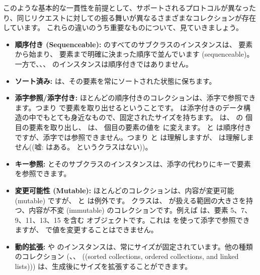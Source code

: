 \documentclass[a4paper,10pt,twoside]{book}
\begin{document}
このような基本的な一貫性を前提として、サポートされるプロトコルが異なったり、同じリクエストに対しての振る舞いが異なるさまざまなコレクションが存在しています。
これらの違いのうち重要なものについて、見ていきましょう。

\begin{itemize}
  \item {\bf 順序付き (Sequenceable):}
   のすべてのサブクラスのインスタンスは、 要素から始まり、 要素まで明確に決まった順序で並んでいます (sequenceable)。
  一方で、\mbox{、}\mbox{、} のインスタンスは順序付きではありません。

  \item {\bf ソート済み:}
   は、その要素を常にソートされた状態に保ちます。

  \item {\bf 添字参照/添字付き:}
        ほとんどの順序付きのコレクションは、添字で参照できます。つまり  で要素を取り出せるということです。
         は添字付きのデータ構造の中でもとても身近なもので、固定されたサイズを持ちます。 は、 の  個目の要素を取り出し、 は、 個目の要素の値を  に変えます。
         と  は順序付きですが、添字では参照できません。つまり  と  は理解しますが、 は理解しません((嘘:  はある。 というクラスはない))。

  \item {\bf キー参照:}
	 とそのサブクラスのインスタンスは、添字の代わりにキーで要素を参照できます。

  \item {\bf 変更可能性 (Mutable):}
        ほとんどのコレクションは、内容が変更可能 (mutable) ですが、 と  は例外です。
         クラスは、 が扱える範囲の大きさを持つ、内容が不変 (immutable) のコレクションです。例えば は、要素 5、7、9、11、13、15 を含む  オブジェクトです。これは  を使って添字で参照できますが、 で値を変更することはできません。

  \item {\bf 動的拡張:}
          や  のインスタンスは、常にサイズが固定されています。他の種類のコレクション (、、 ((sorted collections, ordered collections, and linked lists))) は、生成後にサイズを拡張することができます。


\end{itemize}
\end{document}
